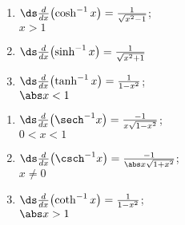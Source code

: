 \setboxwidth{30pt}
{%
\begin{minipage}[t]{.45\specialboxlength}
\begin{enumerate}
\item $\ds\frac d{dx}\bigl(\cosh^{-1}x\bigr)=\frac1{\sqrt{x^2-1}}$;\\\null\qquad$x>1$
\item $\ds\frac d{dx}\bigl(\sinh^{-1}x\bigr)=\frac1{\sqrt{x^2+1}}$\\\vphantom{$x\ne0$}
\item $\ds\frac d{dx}\bigl(\tanh^{-1}x\bigr)=\frac1{1-x^2}$;\\\null\qquad$\abs x<1$
\end{enumerate}
\end{minipage}%
\begin{minipage}[t]{.55\specialboxlength}
\begin{enumerate}\addtocounter{enumi}{3}
\item $\ds\frac d{dx}\bigl(\sech^{-1}x\bigr)=\frac{-1}{x\sqrt{1-x^2}}$;\\\null\qquad$0<x<1$
\item $\ds\frac d{dx}\bigl(\csch^{-1}x\bigr)=\frac{-1}{\abs x\sqrt{1+x^2}}$;\\\null\qquad$x\neq0$
\item $\ds\frac d{dx}\bigl(\coth^{-1}x\bigr)=\frac1{1-x^2}$;\\\null\qquad$\abs x>1$
\end{enumerate}
\end{minipage}}

